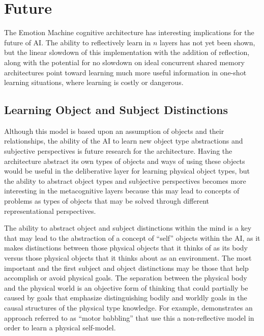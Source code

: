 \chapter{Future}\label{chapter:future}

The Emotion Machine cognitive architecture has interesting
implications for the future of AI.  The ability to reflectively learn
in $n$ layers has not yet been shown, but the linear slowdown of this
implementation with the addition of reflection, along with the
potential for no slowdown on ideal concurrent shared memory
architectures point toward learning much more useful information in
one-shot learning situations, where learning is costly or dangerous.

\section{Learning Object and Subject Distinctions}
\label{section:objective_reflection}

Although this model is based upon an assumption of objects and their
relationships, the ability of the AI to learn new object type
abstractions and subjective perspectives is future research for the
architecture.  Having the architecture abstract its own types of
objects and ways of using these objects would be useful in the
deliberative layer for learning physical object types, but the ability
to abstract object types and subjective perspectives becomes more
interesting in the metacognitive layers because this may lead to
concepts of problems as types of objects that may be solved through
different representational perspectives.

The ability to abstract object and subject distinctions within the
mind is a key that may lead to the abstraction of a concept of
``self'' objects within the AI, as it makes distinctions between those
physical objects that it thinks of as its body versus those physical
objects that it thinks about as an environment.  The most important
and the first subject and object distinctions may be those that help
accomplish or avoid physical goals.  The separation between the
physical body and the physical world is an objective form of thinking
that could partially be caused by goals that emphasize distinguishing
bodily and worldly goals in the causal structures of the physical type
knowledge.  For example, \cite{bongard:2006} demonstrates an approach
referred to as ``motor babbling'' that use this a non-reflective model
in order to learn a physical self-model.

